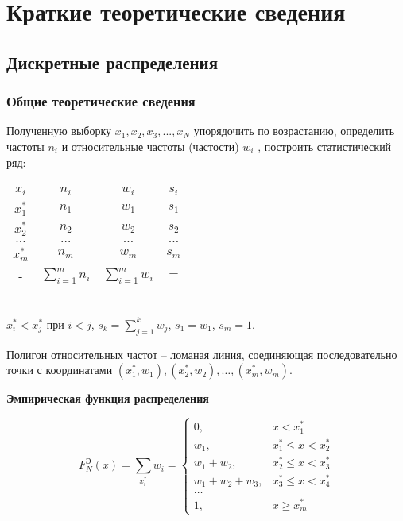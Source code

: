 \section{Краткие теоретические сведения}

\subsection{Дискретные распределения}
\subsubsection{Общие теоретические сведения}

Полученную выборку ${x_1 , x_2 , x_3 , ..., x_N}$ упорядочить по возрастанию, определить частоты $n_i$ и относительные частоты (частости) $w_i$ , построить статистический ряд:\\


\begin{tabular}{|c|c|c|c|}
  \hline
  $x_i$ & $n_i$ & $w_i$ & $s_i$ \\
  \hline
  $x_{1}^{*}$ & $n_1$ & $w_1$ & $s_1$ \\
  \hline
  $x_{2}^{*}$ & $n_2$ & $w_2$ & $s_2$ \\
  \hline
  $\dots$ & $\dots$ & $\dots$ & $\dots$ \\
  \hline
  $x_{m}^{*}$ & $n_m$ & $w_m$ & $s_m$ \\
  \hline
  - & $\sum\limits_{i=1}^{m}n_i$ & $\sum\limits_{i=1}^{m}w_i$ & $-$ \\
  \hline
\end{tabular}\\
$x_i^* < x_j^*$ при $i < j$, $s_k = \sum\limits_{j=1}^k w_j$, $s_1 = w_1$, $s_m = 1$.

Полигон относительных частот – ломаная линия, соединяющая последовательно 
точки с координатами $(x_1^* , w_1 ), (x_2^* , w_2 ), \dots , (x_m^*
, w_m ).$

\textbf{Эмпирическая функция распределения}


\begin{equation*}
  F_N^{\text{Э}}(x)= \sum\limits_{x_i^*}w_i = 
\begin{cases}
0, &x<x_1^*\\
w_1, &x_1^* \leq x < x_2^* \\
w_1+w_2, & x_2^* \leq x < x_3^* \\
w_1+w_2+w_3, & x_3^* \leq x < x_4^* \\
\dots \\
1, & x \geq x_m^*
\end{cases}
\end{equation*}

